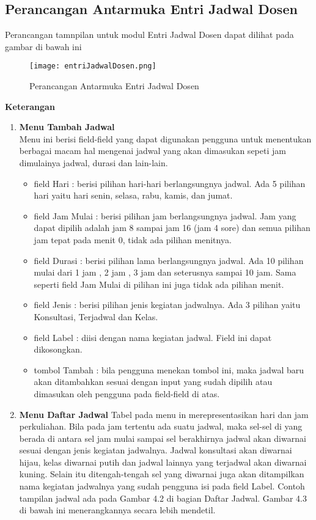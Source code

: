\subsection{Perancangan Antarmuka Entri Jadwal Dosen}
Perancangan tamnpilan untuk modul Entri Jadwal Dosen dapat dilihat pada gambar di bawah ini
\begin{figure} [H]
	\centering  
	\texttt{[image: entriJadwalDosen.png]}
	\caption[Perancangan Antarmuka Entri Jadwal Dosen]{Perancangan Antarmuka Entri Jadwal Dosen} 
	\label{fig:flow-chart-CodeIgniter} 
\end{figure}
\textbf{Keterangan}
\begin{enumerate}
\item \textbf{Menu Tambah Jadwal}\\ Menu ini berisi field-field yang dapat digunakan pengguna untuk menentukan berbagai macam hal mengenai jadwal yang akan dimasukan sepeti jam dimulainya jadwal, durasi dan lain-lain.
	\begin{itemize}
		\item field Hari : berisi pilihan hari-hari berlangsungnya jadwal. Ada 5 pilihan hari yaitu hari senin, selasa, rabu, kamis, dan jumat.
		\item field Jam Mulai : berisi pilihan jam berlangsungnya jadwal. Jam yang dapat dipilih adalah jam 8 sampai jam 16 (jam 4 sore) dan semua 		pilihan jam tepat pada menit 0, tidak ada pilihan menitnya.
		\item field Durasi : berisi pilihan lama berlangsungnya jadwal. Ada 10 pilihan mulai dari 1 jam , 2 jam , 3 jam dan seterusnya sampai 10 			jam. Sama seperti field Jam Mulai di pilihan ini juga tidak ada pilihan menit.
		\item field Jenis : berisi pilihan jenis kegiatan jadwalnya. Ada 3 pilihan yaitu Konsultasi, Terjadwal dan Kelas.
		\item field Label : diisi dengan nama kegiatan jadwal. Field ini dapat dikosongkan.
		\item tombol Tambah : bila pengguna menekan tombol ini, maka jadwal baru akan ditambahkan sesuai dengan input yang sudah dipilih atau dimasukan oleh pengguna pada field-field di atas.
	\end{itemize}
\item \textbf{Menu Daftar Jadwal} \newline
Tabel pada menu in merepresentasikan hari dan jam perkuliahan. Bila pada jam tertentu ada suatu jadwal, maka sel-sel di yang berada di antara sel jam mulai sampai sel berakhirnya jadwal akan diwarnai sesuai dengan jenis kegiatan jadwalnya. Jadwal konsultasi akan diwarnai hijau, kelas diwarnai putih dan jadwal lainnya yang terjadwal akan diwarnai kuning. Selain itu ditengah-tengah sel yang diwarnai juga akan ditampilkan nama kegiatan jadwalnya yang sudah pengguna isi pada field Label. Contoh tampilan jadwal ada pada Gambar 4.2 di bagian Daftar Jadwal. Gambar 4.3 di bawah ini menerangkannya secara lebih mendetil.

\end{enumerate}
